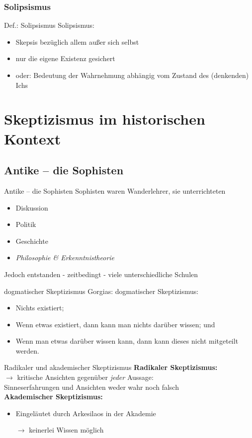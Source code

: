 \documentclass[12pt]{beamer}
\begin{document}
\subsubsection{Solipsismus}
\begin{frame}{Def.: Solipsismus}
Solipsismus:
\begin{itemize}
\item Skepsis bezüglich allem außer sich selbst
\item nur die eigene Existenz gesichert
\item oder: Bedeutung der Wahrnehmung abhängig vom Zustand des (denkenden) Ichs
\end{itemize}
\end{frame}

\section{Skeptizismus im historischen Kontext}
\subsection{Antike – die Sophisten}
\begin{frame}{Antike – die Sophisten}
Sophisten waren Wanderlehrer, sie unterrichteten
\begin{itemize}
\item Diskussion
\item Politik
\item Geschichte
\item \emph{Philosophie \& Erkenntnistheorie}
\end{itemize}
Jedoch entstanden - zeitbedingt - viele unterschiedliche Schulen
\end{frame}

\begin{frame}{dogmatischer Skeptizismus}
Gorgias: dogmatischer Skeptizismus:
\begin{itemize}
\item Nichts existiert;
\item Wenn etwas existiert, dann kann man nichts darüber wissen; und
\item Wenn man etwas darüber wissen kann, dann kann dieses nicht mitgeteilt werden.
\end{itemize}
\end{frame}

\begin{frame}{Radikaler und akademischer Skeptizismus}
\textbf{Radikaler Skeptizismus:}\\
$\rightarrow$ kritische Ansichten gegenüber \emph{jeder} Aussage:\\
\glqq Sinneserfahrungen und Ansichten  weder wahr noch falsch\grqq\\
\textbf{Akademischer Skeptizismus:}\\
\begin{itemize}
\item Eingeläutet durch Arkesilaos in der Akademie
\item[$\rightarrow$] keinerlei Wissen möglich
\end{itemize}
\end{frame}
\end{document}
